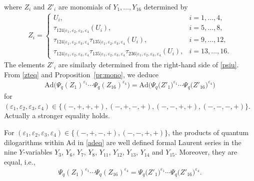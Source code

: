 where $Z_i$ and $Z'_i$ are monomials of $Y_1, \dots, Y_{16}$
determined by
\begin{align}\label{zu}
Z_i = \begin{cases} U_i, & i = 1,\dotsc, 4,
\\
 \tau_{124|\varepsilon_1,\varepsilon_2,\varepsilon_3,\varepsilon_4}
 (U_i), & i=5,\dotsc, 8,
\\
\tau_{124|\varepsilon_1,\varepsilon_2,\varepsilon_3,\varepsilon_4}
\tau_{135|\varepsilon_1,\varepsilon_2,\varepsilon_3,\varepsilon_4}
(U_i), & i=9, \ldots, 12,
\\
\tau_{124|\varepsilon_1,\varepsilon_2,\varepsilon_3,\varepsilon_4}
\tau_{135|\varepsilon_1,\varepsilon_2,\varepsilon_3,\varepsilon_4}
\tau_{236|\varepsilon_1,\varepsilon_2,\varepsilon_3,\varepsilon_4}
(U_i), & i=13, \ldots, 16.
\end{cases}
\end{align}
The elements $Z'_i$ are similarly determined from the
right-hand side of \eqref{psiu}.
%
From \eqref{zteq} and Proposition~\ref{pr:mono}, we deduce
\begin{align}\label{adeq}
\mathrm{Ad}\bigl(\Psi_q(Z_1)^{\varepsilon_1}\cdots \Psi_q(Z_{16})^{\varepsilon_{4}}\bigr)
=\mathrm{Ad}\bigl(\Psi_q\bigl(Z'_1\bigr)^{\varepsilon_1}\cdots \Psi_q\bigl(Z'_{16}\bigr)^{\varepsilon_{4}}\bigr)
\end{align}
for $(\varepsilon_1,\varepsilon_2,\varepsilon_3,\varepsilon_4) \in
\{(-,+,+,+), (-,+,-,+), (-,-,+,+), (-,-,-,+)\}$.
Actually a stronger equality holds.

\begin{Proposition}\label{pr:dilog}
For $(\varepsilon_1,\varepsilon_2,\varepsilon_3,\varepsilon_4) \in \{(-,+,-,+), (-,-,+,+)\}$,
the products of quantum dilogarithms within $\mathrm{Ad}$ in \eqref{adeq}
are well defined formal Laurent series in
the nine $Y$-variables
$Y_3$, $Y_6$, $Y_7$, $Y_8$, $Y_{11}$, $Y_{12}$, $Y_{13}$, $Y_{14}$ and $Y_{15}$.
Moreover, they are equal, i.e.,
\begin{align}\label{pseq}
\Psi_q(Z_1)^{\varepsilon_1}\dotsm \Psi_q(Z_{16})^{\varepsilon_{4}}
=
\Psi_q\bigl(Z'_1\bigr)^{\varepsilon_1}\dotsm \Psi_q\bigl(Z'_{16}\bigr)^{\varepsilon_{4}}.
\end{align}
\end{Proposition}

